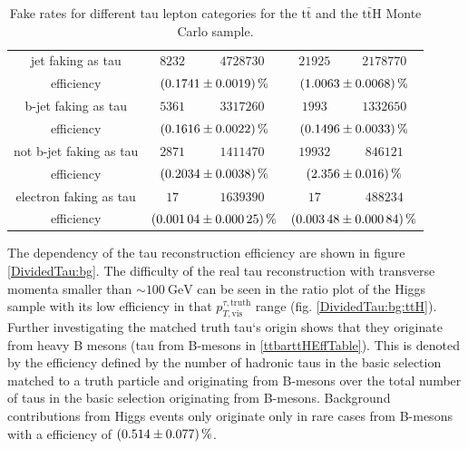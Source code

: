 \begin{table}
\begin{tabular*}{\linewidth}{@{\extracolsep{\fill}}ccccc}
		jet faking as tau            & $8232$         & $4728730$      & $21925$         & $2178770$ 
		\\
		efficiency                  & \multicolumn{2}{c}{$\SI{0.1741\pm 0.0019}{\percent}$}   & \multicolumn{2}{c}{$\SI{1.0063\pm 0.0068}{\percent}$}
		\\
		\hline
		b-jet faking as tau          & $5361$        & $3317260$      & $1993$         & $1332650$ 
		\\
		efficiency                  & \multicolumn{2}{c}{$\SI{0.1616\pm 0.0022}{\percent}$}   & \multicolumn{2}{c}{$\SI{0.1496\pm 0.0033}{\percent}$}
		\\
		\hline
                not b-jet faking as tau          & $2871$        & $1411470$      & $19932$         & $846121$ 
		\\
		efficiency                  & \multicolumn{2}{c}{$\SI{0.2034\pm 0.0038}{\percent}$}   & \multicolumn{2}{c}{$\SI{2.356\pm 0.016}{\percent}$}
		\\
                \hline
                electron faking as tau          & $17$        & $1639390$      & $17$         & $488234$ 
		\\
		efficiency                  & \multicolumn{2}{c}{$\SI{0.00104\pm 0.00025}{\percent}$}   & \multicolumn{2}{c}{$\SI{0.00348\pm 0.00084}{\percent}$}
		\\
		\hline
		\hline
		\end{tabular*}
		\caption[Fake rates for the t$\bar{\text{t}}$ and the t$\bar{\text{t}}$H sample.]{Fake rates for different tau lepton categories for the t$\bar{\text{t}}$ and the t$\bar{\text{t}}$H Monte Carlo sample.}
		\label{ttbarttHfakeTable}
          \renewcommand{\arraystretch}{1}
\end{table}
%
The dependency of the tau reconstruction efficiency are shown in figure \ref{DividedTau:bg}. The difficulty of the real tau reconstruction with transverse momenta smaller than $\sim\SI{100}{\giga\electronvolt}$ can be seen in the ratio plot of the Higgs sample with its low efficiency in that $p_{T,\text{vis}}^{\tau,\text{truth}}$ range (fig. \ref{DividedTau:bg:ttH}). Further investigating the matched truth tau`s origin shows that they originate from heavy B mesons (tau from B-mesons in \ref{ttbarttHEffTable}). This is denoted by the efficiency defined by the number of hadronic taus in the basic selection matched to a truth particle and originating from B-mesons over the total number of taus in the basic selection originating from B-mesons. Background contributions from Higgs events only originate only in rare cases from B-mesons with a efficiency of $\SI{0.514\pm 0.077}{\percent}$.\par       
